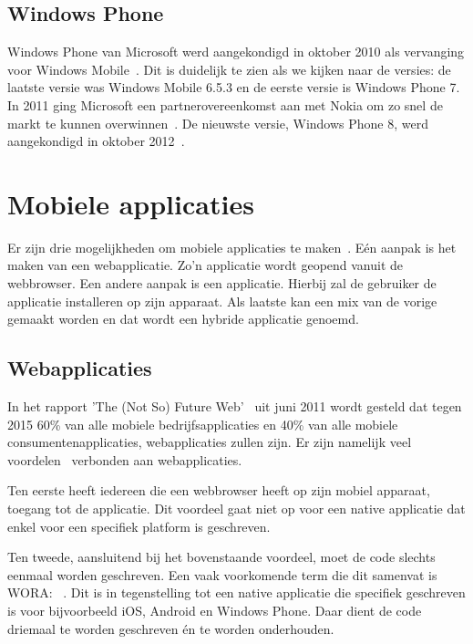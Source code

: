 \subsection{Windows Phone}
Windows Phone van Microsoft werd aangekondigd in oktober 2010 als vervanging voor Windows Mobile~\cite{Seitz2010,Lieberman2010}. Dit is duidelijk te zien als we kijken naar de versies: de laatste versie was Windows Mobile 6.5.3 en de eerste versie is Windows Phone 7. In 2011 ging Microsoft een partnerovereenkomst aan met Nokia om zo snel de markt te kunnen overwinnen~\cite{Microsoft2011}. De nieuwste versie, Windows Phone 8, werd aangekondigd in oktober 2012~\cite{Reed2012}. 


\section{Mobiele applicaties}
\label{sec:mobiele-applicaties}
Er zijn drie mogelijkheden om mobiele applicaties te maken~\cite{Accenture2012,Hales2012}. Eén aanpak is het maken van een webapplicatie.
Zo'n applicatie wordt geopend vanuit de webbrowser. Een andere aanpak is een  applicatie. Hierbij zal de gebruiker de applicatie installeren op zijn apparaat. Als laatste kan een mix van de vorige gemaakt worden en dat wordt een hybride applicatie genoemd.

\subsection{Webapplicaties}
In het rapport 'The (Not So) Future Web'~\cite{Phifer2011} uit juni 2011 wordt gesteld dat tegen 2015 60\% van alle mobiele bedrijfsapplicaties en 40\% van alle mobiele consumentenapplicaties, webapplicaties zullen zijn. Er zijn namelijk veel voordelen~\cite{Accenture2012} verbonden aan webapplicaties.

Ten eerste heeft iedereen die een webbrowser heeft op zijn mobiel apparaat, toegang tot de applicatie.  Dit voordeel gaat niet op voor een native applicatie dat enkel voor een specifiek platform is geschreven. 

Ten tweede, aansluitend bij het bovenstaande voordeel, moet de code slechts eenmaal worden geschreven. Een vaak voorkomende term die dit samenvat is WORA: ~\cite{Hales2012}. Dit is in tegenstelling tot een native applicatie die specifiek geschreven is voor bijvoorbeeld iOS, Android en Windows Phone. Daar dient de code driemaal te worden geschreven \'en te worden onderhouden.


